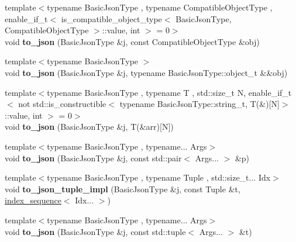 \begin{DoxyCompactItemize}
{\footnotesize template$<$typename Basic\+Json\+Type , typename Compatible\+Object\+Type , enable\+\_\+if\+\_\+t$<$ is\+\_\+compatible\+\_\+object\+\_\+type$<$ Basic\+Json\+Type, Compatible\+Object\+Type $>$\+::value, int $>$  = 0$>$ }\\void {\bfseries to\+\_\+json} (Basic\+Json\+Type \&j, const Compatible\+Object\+Type \&obj)
\item 
\mbox{\label{namespacenlohmann_1_1detail_ac9f7a5542851c61d93740148eaec509f}} 
{\footnotesize template$<$typename Basic\+Json\+Type $>$ }\\void {\bfseries to\+\_\+json} (Basic\+Json\+Type \&j, typename Basic\+Json\+Type\+::object\+\_\+t \&\&obj)
\item 
\mbox{\label{namespacenlohmann_1_1detail_a8c4d301fc51996e3c5c1257fb92ace20}} 
{\footnotesize template$<$typename Basic\+Json\+Type , typename T , std\+::size\+\_\+t N, enable\+\_\+if\+\_\+t$<$ not std\+::is\+\_\+constructible$<$ typename Basic\+Json\+Type\+::string\+\_\+t, T(\&)\mbox{[}\+N\mbox{]}$>$\+::value, int $>$  = 0$>$ }\\void {\bfseries to\+\_\+json} (Basic\+Json\+Type \&j, T(\&arr)\mbox{[}N\mbox{]})
\item 
\mbox{\label{namespacenlohmann_1_1detail_aa30611f74062379d3420c40487cf3bb3}} 
{\footnotesize template$<$typename Basic\+Json\+Type , typename... Args$>$ }\\void {\bfseries to\+\_\+json} (Basic\+Json\+Type \&j, const std\+::pair$<$ Args... $>$ \&p)
\item 
\mbox{\label{namespacenlohmann_1_1detail_a510dfa15b01e9a8afe31600a27b28199}} 
{\footnotesize template$<$typename Basic\+Json\+Type , typename Tuple , std\+::size\+\_\+t... Idx$>$ }\\void {\bfseries to\+\_\+json\+\_\+tuple\+\_\+impl} (Basic\+Json\+Type \&j, const Tuple \&t, \mbox{\hyperlink{structnlohmann_1_1detail_1_1index__sequence}{index\+\_\+sequence}}$<$ Idx... $>$)
\item 
\mbox{\label{namespacenlohmann_1_1detail_aa7a47b08eee864c2c108c04954919648}} 
{\footnotesize template$<$typename Basic\+Json\+Type , typename... Args$>$ }\\void {\bfseries to\+\_\+json} (Basic\+Json\+Type \&j, const std\+::tuple$<$ Args... $>$ \&t)

\end{DoxyCompactItemize}
